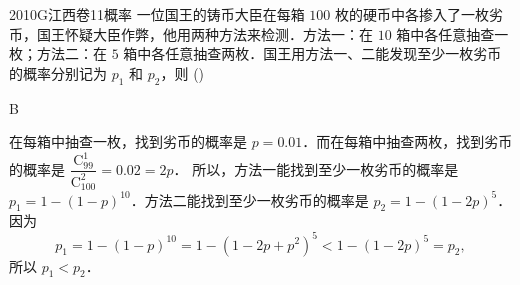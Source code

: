 
\begin{problem}{2010}{G}{江西卷}{11}{概率}
一位国王的铸币大臣在每箱 $100$ 枚的硬币中各掺入了一枚劣币，国王怀疑大臣作弊，他用两种方法来检测．方法一：在 $10$ 箱中各任意抽查一枚；方法二：在 $5$ 箱中各任意抽查两枚．国王用方法一、二能发现至少一枚劣币的概率分别记为 $p_1$ 和 $p_2$，则 (\hspace{1cm})
\begin{choices}
\end{choices}
\end{problem}

\begin{answer}
B
\end{answer}

\begin{solutions}
在每箱中抽查一枚，找到劣币的概率是 $p = 0.01$．而在每箱中抽查两枚，找到劣币的概率是 $\dfrac{\mathrm{C}_{99}^{1}}{\mathrm{C}_{100}^{2}} = 0.02 = 2p$．  
所以，方法一能找到至少一枚劣币的概率是 $p_1 = 1 - (1 - p)^{10}$．方法二能找到至少一枚劣币的概率是 $p_2 = 1 - (1 - 2p)^5$．因为  
$$
p_1 = 1 - (1 - p)^{10} = 1 - (1 - 2p + p^2)^5 < 1 - (1 - 2p)^5 = p_2,
$$  
所以 $p_1 < p_2$．
\end{solutions}